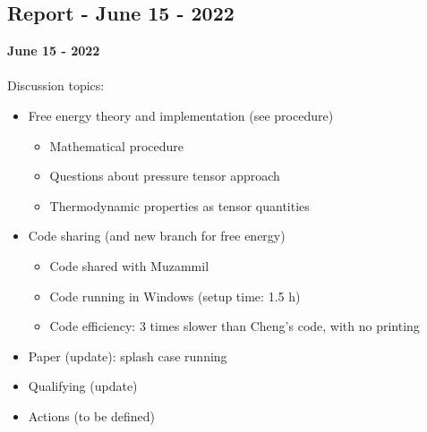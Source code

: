 \documentclass[8pt]{beamer}
\begin{document}
	\subsection{Report - June 15 - 2022}
	\label{}
	\justifying
	\begin{frame}{}
		\textbf{June 15 - 2022}\\~\\
		Discussion topics:
		\begin{itemize}
			\item Free energy theory and implementation (see procedure)
			\begin{itemize}
				\item Mathematical procedure
				\item Questions about pressure tensor approach
				\item Thermodynamic properties as tensor quantities
			\end{itemize}
			\item Code sharing (and new branch for free energy)
			\begin{itemize}
				\item Code shared with Muzammil
				\item Code running in Windows (setup time: 1.5 h)
				\item Code efficiency: 3 times slower than Cheng's code, with no printing
				
			\end{itemize}
			\item Paper (update): splash case running
			\item Qualifying (update)
			\item Actions (to be defined)
		\end{itemize}
		
	\end{frame}
	
\end{document}
